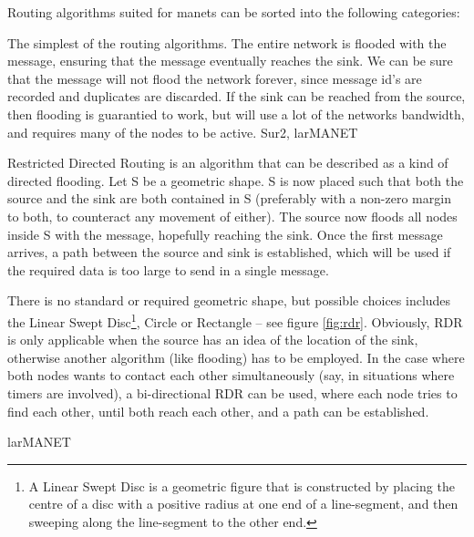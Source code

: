 Routing algorithms suited for \acp{manet} can be sorted into the following categories:
\begin{description}
{The simplest of the routing algorithms. The entire network is flooded with the message, ensuring that the message eventually reaches the sink. We can be sure that the message will not flood the network forever, since message id's are recorded and duplicates are discarded. If the sink can be reached from the source, then flooding is  guarantied to work, but will use a lot of the networks bandwidth, and requires many of the nodes to be active.}
{Sur2, larMANET} 


      {Restricted Directed Routing is an algorithm that can be described as a kind of directed flooding. Let S be a geometric shape. S is now placed such that both the source and the sink are both contained in S (preferably with a non-zero margin to both, to counteract any movement of either). The source now floods all nodes inside S with the message, hopefully reaching the sink. Once the first message arrives, a path between the source and sink is established, which will be used if the required data is too large to send in a single message.

There is no standard or required geometric shape, but possible choices includes the Linear Swept Disc\footnote{A Linear Swept Disc is a geometric figure that is constructed by placing the centre of a disc with a positive radius at one end of a line-segment, and then sweeping along the line-segment to the other end.}, Circle or Rectangle -- see figure \ref{fig:rdr}. Obviously, RDR is only applicable when the source has an idea of the location of the sink, otherwise another algorithm (like flooding) has to be employed. In the case where both nodes wants to contact each other simultaneously (say, in situations where timers are involved), a bi-directional RDR can be used, where each node tries to find each other, until both reach each other, and a path can be established.}
{larMANET}


\end{description}
